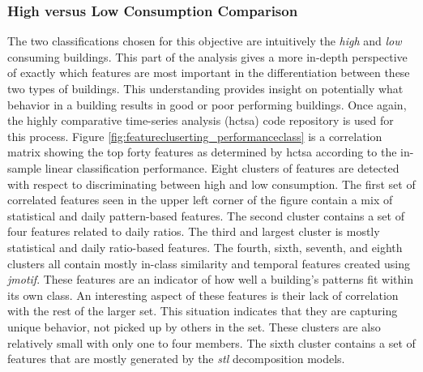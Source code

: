 \subsubsection{High versus Low Consumption Comparison}
\label{sec:highvslow}

The two classifications chosen for this objective are intuitively the \emph{high} and \emph{low} consuming buildings. This part of the analysis gives a more in-depth perspective of exactly which features are most important in the differentiation between these two types of buildings. This understanding provides insight on potentially what behavior in a building results in good or poor performing buildings. Once again, the highly comparative time-series analysis (hctsa) code repository is used for this process. Figure \ref{fig:featurecluserting_performanceclass} is a correlation matrix showing the top forty features as determined by hctsa according to the in-sample linear classification performance. Eight clusters of features are detected with respect to discriminating between high and low consumption. The first set of correlated features seen in the upper left corner of the figure contain a mix of statistical and daily pattern-based features. The second cluster contains a set of four features related to daily ratios. The third and largest cluster is mostly statistical and daily ratio-based features. The fourth, sixth, seventh, and eighth clusters all contain mostly in-class similarity and temporal features created using \emph{jmotif}. These features are an indicator of how well a building's patterns fit within its own class. An interesting aspect of these features is their lack of correlation with the rest of the larger set. This situation indicates that they are capturing unique behavior, not picked up by others in the set. These clusters are also relatively small with only one to four members. The sixth cluster contains a set of features that are mostly generated by the \emph{stl} decomposition models.

